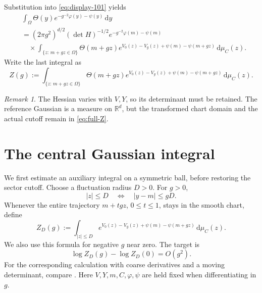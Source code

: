 \documentclass[10pt,reqno]{amsart}
\theoremstyle{definition}
\theoremstyle{remark}
\newtheorem{remark}[definition]{Remark}
\numberwithin{equation}{section}
\numberwithin{figure}{section}
\newcommand{\dd}{\mathrm d}
\newcommand{\R}{\mathbb R}
\begin{document}
Substitution into \eqref{eq:display-101} yields
\begin{equation}\label{eq:full-gaussian-representation}
\begin{aligned}
&\int_\Omega\Theta(y)e^{-g^{-2}\varphi(y)-\psi(y)}\,\dd y\\
&=(2\pi g^2)^{d/2}(\det H)^{-1/2}
e^{-g^{-2}\varphi(m)-\psi(m)}\\
&\quad\times\int_{\{z:\,m+gz\in\Omega\}}
\Theta(m+gz)
e^{V_0(z)-V_g(z)+\psi(m)-\psi(m+gz)}\,\dd\mu_C(z).
\end{aligned}
\end{equation}
Write the last integral as
\begin{equation}\label{eq:full-Z}
Z(g):=\int_{\{z:\,m+gz\in\Omega\}}
\Theta(m+gz)
e^{V_0(z)-V_g(z)+\psi(m)-\psi(m+gz)}\,\dd\mu_C(z).
\end{equation}
\begin{remark}
The Hessian varies with $V,Y$, so its determinant must be retained.
The reference Gaussian is a measure on $\R^d$, but the transformed chart
domain and the actual cutoff remain in \eqref{eq:full-Z}.
\end{remark}

\section{The central Gaussian integral}\label{sec:central-estimates}
We first estimate an auxiliary integral on a symmetric ball, before restoring
the sector cutoff. Choose a fluctuation radius $D>0$. For $g>0$,
\begin{equation}\label{eq:central-ball-coordinates}
|z|\le D\quad\Longleftrightarrow\quad |y-m|\le gD.
\end{equation}
Whenever the entire trajectory $m+tgz$, $0\le t\le1$, stays in the smooth
chart, define
\begin{equation}\label{eq:central-Z-definition}
Z_D(g):=\int_{|z|\le D}
e^{V_0(z)-V_g(z)+\psi(m)-\psi(m+gz)}\,\dd\mu_C(z).
\end{equation}
We also use this formula for negative $g$ near zero. The target is
\begin{equation}\label{eq:central-target}
\log Z_D(g)-\log Z_D(0)=O(g^2).
\end{equation}
For the corresponding calculation with coarse derivatives and a moving
determinant, compare \cite[Section~12, Theorem~12.5, pp.~42--43]{Exposition}.
Here $V,Y,m,C,\varphi,\psi$ are held fixed when differentiating in $g$.
\end{document}
